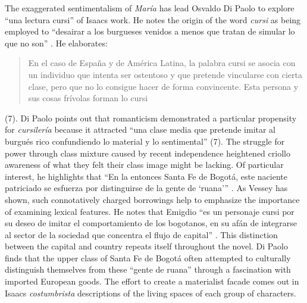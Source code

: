 \documentclass[12pt]{report}
\begin{document}
The exaggerated sentimentalism of \textit{María} has lead Osvaldo Di Paolo to explore \enquote{una lectura cursi} of Isaacs work. 
He notes the origin of the word \textit{cursi} as being employed to \enquote{desairar a los burgueses venidos a menos que tratan de simular lo que no son} \autocite[7]{Paolo}. 
He elaborates: \blockquote{En el caso de España y de América Latina, la palabra cursi se asocia con un individuo que intenta ser ostentoso y que pretende vincularse con cierta clase, pero que no lo consigue hacer de forma convincente. Esta persona y sus cosas frívolas forman lo cursi} (7). 
Di Paolo points out that romanticism demonstrated a particular propensity for \textit{cursilería} because it attracted \enquote{una clase media que pretende imitar al burgués rico confundiendo lo material y lo sentimental} (7).
The struggle for power through class mixture caused by recent independence heightened criollo awareness of what they felt their class image might be lacking.
Of particular interest, he highlights that \enquote{En la entonces Santa Fe de Bogotá, este naciente patriciado se esfuerza por distinguirse de la gente de \enquote{ruana}} \autocite[8]{Paolo}. 
As Vessey has shown, such connotatively charged borrowings help to emphasize the importance of examining lexical features.
He notes that Emigdio \enquote{es un personaje cursi por su deseo de imitar el comportamiento de los bogotanos, en su afán de integrarse al sector de la sociedad que concentra el flujo de capital} \autocite[9]{Paolo}. 
This distinction between the capital and country repeats itself throughout the novel.
Di Paolo finds that the upper class of Santa Fe de Bogotá often attempted to culturally distinguish themselves from these \enquote{gente de ruana} through a fascination with imported European goods.
The effort to create a materialist facade comes out in Isaacs \textit{costumbrista} descriptions of the living spaces of each group of characters.
\end{document}
